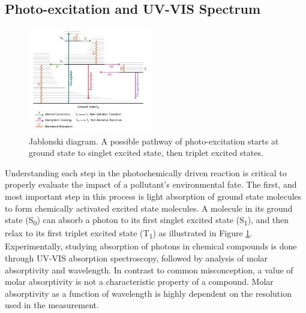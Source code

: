 \documentclass[
journal=jpcbfk, %
manuscript=article]{achemso}
\begin{document}
	\subsection{Photo-excitation and UV-VIS Spectrum}
	\begin{figure}
		\centering	
		\includegraphics[width=0.48\textwidth]{images/jablonski.pdf}
		\caption{Jablonski diagram.\cite{Salvato-Vallverdu2009} A possible pathway of photo-excitation starts at ground state to singlet excited state, then triplet excited states.}\label{fig:jablonski}
		\vspace{-15pt}
	\end{figure}
	Understanding each step in the photochemically driven reaction is critical to properly evaluate the impact of a pollutant's
	environmental fate. The first, and most important step in this process is light absorption of ground state molecules to form chemically activated excited state molecules. A molecule in its ground state (S\textsubscript{0}) can absorb a photon to its first singlet excited state (S\textsubscript{1}), and then relax to its first triplet excited state (T\textsubscript{1}) as illustrated in Figure \ref{fig:jablonski}. Experimentally, studying absorption of photons in chemical compounds is done through UV-VIS absorption spectroscopy, followed by analysis of molar absorptivity and wavelength. In contrast to common misconception, a value of molar absorptivity is not a characteristic property of a compound. Molar absorptivity as a function of wavelength is highly dependent on the resolution used in the measurement.\cite{Hirayama2010}	
\end{document}
